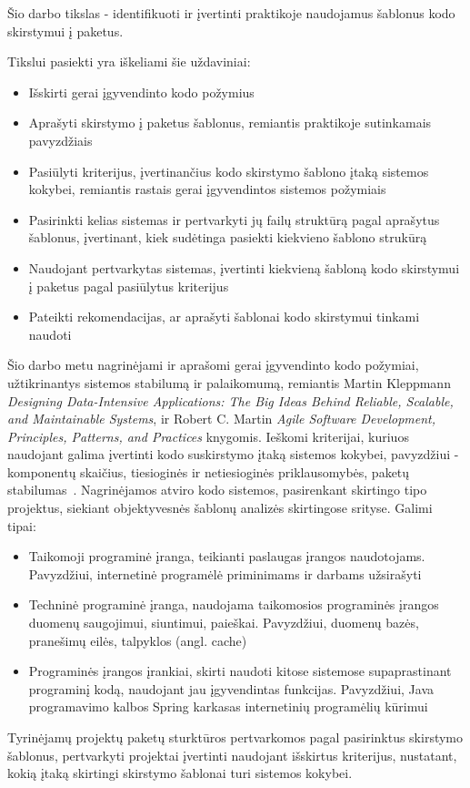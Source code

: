 Šio darbo tikslas - identifikuoti ir įvertinti praktikoje naudojamus šablonus kodo skirstymui į paketus.

Tikslui pasiekti yra iškeliami šie uždaviniai:
\begin{itemize}
    \item  Išskirti gerai įgyvendinto kodo požymius
    \item  Aprašyti skirstymo į paketus šablonus, remiantis praktikoje sutinkamais pavyzdžiais
    \item  Pasiūlyti kriterijus, įvertinančius kodo skirstymo šablono įtaką sistemos kokybei, remiantis
rastais gerai įgyvendintos sistemos požymiais
    \item  Pasirinkti kelias sistemas ir pertvarkyti jų failų struktūrą pagal aprašytus šablonus, įvertinant,
kiek sudėtinga pasiekti kiekvieno šablono strukūrą
    \item  Naudojant pertvarkytas sistemas, įvertinti kiekvieną šabloną kodo skirstymui į paketus pagal pasiūlytus kriterijus
    \item  Pateikti rekomendacijas, ar aprašyti šablonai kodo skirstymui tinkami naudoti
\end{itemize}

Šio darbo metu nagrinėjami ir aprašomi gerai įgyvendinto kodo požymiai, užtikrinantys
sistemos stabilumą ir palaikomumą, remiantis Martin Kleppmann \textit{Designing Data-Intensive Applications: The Big Ideas Behind Reliable, Scalable, and Maintainable Systems},
ir Robert C. Martin \textit{Agile Software Development, Principles, Patterns, and Practices} knygomis.
Ieškomi kriterijai, kuriuos naudojant galima įvertinti kodo suskirstymo įtaką sistemos kokybei, pavyzdžiui - komponentų skaičius,
tiesioginės ir netiesioginės priklausomybės, paketų stabilumas~\cite{AgileSoftwareDevelopment}.
Nagrinėjamos atviro kodo sistemos, pasirenkant skirtingo tipo projektus, siekiant
objektyvesnės šablonų analizės skirtingose srityse.
Galimi tipai:
    \begin{itemize}
        \item Taikomoji programinė įranga, teikianti paslaugas įrangos naudotojams. Pavyzdžiui,
internetinė programėlė priminimams ir darbams užsirašyti
        \item Techninė programinė įranga, naudojama taikomosios programinės įrangos duomenų
saugojimui, siuntimui, paieškai. Pavyzdžiui, duomenų bazės, pranešimų eilės, talpyklos
(angl. cache)
        \item Programinės įrangos įrankiai, skirti naudoti kitose sistemose supaprastinant programinį
kodą, naudojant jau įgyvendintas funkcijas. Pavyzdžiui, Java programavimo kalbos
Spring karkasas internetinių programėlių kūrimui
    \end{itemize}
Tyrinėjamų projektų paketų sturktūros pertvarkomos pagal pasirinktus skirstymo šablonus, pertvarkyti projektai įvertinti naudojant išskirtus kriterijus, nustatant, kokią įtaką
skirtingi skirstymo šablonai turi sistemos kokybei.

